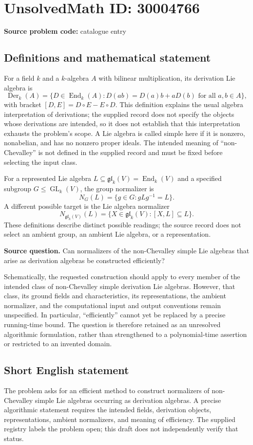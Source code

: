 \documentclass[11pt]{article}
\begin{document}
\section*{UnsolvedMath ID: 30004766}
\textbf{Source problem code:} catalogue entry
\subsection{Definitions and mathematical statement}
For a field \(k\) and a \(k\)-algebra \(A\) with bilinear multiplication, its derivation Lie algebra is
\[
\operatorname{Der}_k(A)=\{D\in\operatorname{End}_k(A):D(ab)=D(a)b+aD(b)\text{ for all }a,b\in A\},
\]
with bracket \([D,E]=D\circ E-E\circ D\). This definition explains the usual algebra interpretation of derivations; the supplied record does not specify the objects whose derivations are intended, so it does not establish that this interpretation exhausts the problem's scope. A Lie algebra is called simple here if it is nonzero, nonabelian, and has no nonzero proper ideals. The intended meaning of ``non-Chevalley'' is not defined in the supplied record and must be fixed before selecting the input class.

For a represented Lie algebra \(L\subseteq\mathfrak{gl}_k(V)=\operatorname{End}_k(V)\) and a specified subgroup \(G\leq\operatorname{GL}_k(V)\), the group normalizer is
\[
N_G(L)=\{g\in G:gLg^{-1}=L\}.
\]
A different possible target is the Lie algebra normalizer
\[
N_{\mathfrak{gl}_k(V)}(L)=\{X\in\mathfrak{gl}_k(V):[X,L]\subseteq L\}.
\]
These definitions describe distinct possible readings; the source record does not select an ambient group, an ambient Lie algebra, or a representation.

\textbf{Source question.} Can normalizers of the non-Chevalley simple Lie algebras that arise as derivation algebras be constructed efficiently?

Schematically, the requested construction should apply to every member of the intended class of non-Chevalley simple derivation Lie algebras. However, that class, its ground fields and characteristics, its representations, the ambient normalizer, and the computational input and output conventions remain unspecified. In particular, ``efficiently'' cannot yet be replaced by a precise running-time bound. The question is therefore retained as an unresolved algorithmic formulation, rather than strengthened to a polynomial-time assertion or restricted to an invented domain.
\subsection{Short English statement}
The problem asks for an efficient method to construct normalizers of non-Chevalley simple Lie algebras occurring as derivation algebras. A precise algorithmic statement requires the intended fields, derivation objects, representations, ambient normalizers, and meaning of efficiency. The supplied registry labels the problem open; this draft does not independently verify that status.
\end{document}
